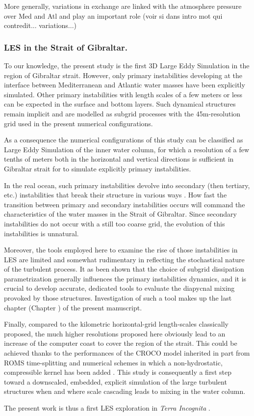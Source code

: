 \color{red}More generally, variations in exchange are linked with the atmosphere pressure over Med and Atl and play an important role (voir si dans intro mot qui contredit... variations...)\color{black}

\subsubsection{LES in the Strait of Gibraltar.}
To our knowledge, the present study is the first 3D Large Eddy Simulation in the region of Gibraltar strait. However, only primary instabilities developing at the interface between Mediterranean and Atlantic water masses have been explicitly simulated. Other primary instabilities  with length scales of a few meters or less can be expected in the surface and bottom layers. Such dynamical structures remain implicit and are modelled as subgrid processes with the 45m-resolution grid used in the present numerical configurations.

As a consequence the numerical configurations of this study can be  classified as Large Eddy Simulation of the inner water column, for which a resolution of a few tenths of meters both in the horizontal and vertical directions is sufficient in Gibraltar strait for to simulate explicitly primary instabilities.

In the real ocean, such primary instabilities devolve into secondary (then tertiary, etc.) instabilities that break their structure in various ways \citep{mashayek_2012}. How fast the transition between primary and secondary instabilities occurs will command the characteristics of the water masses in the Strait of Gibraltar. Since secondary instabilities do not occur with a still too coarse grid, the evolution of this instabilities is unnatural.

Moreover, the tools employed here to examine the rise of those instabilities in LES are limited and somewhat rudimentary in reflecting the stochastical nature of the turbulent process. It as been shown that the choice of subgrid dissipation parametrization generally influences the primary instabilities dynamics, and it is crucial to develop accurate, dedicated tools to evaluate the diapycnal mixing provoked by those structures. Investigation of such a tool makes up the last chapter (Chapter ) of the present manuscript.

Finally, compared to the kilometric horizontal-grid length-scales classically proposed, the much higher resolutions proposed here obviously lead to an increase of the computer coast to cover the region of the strait. This could be achieved thanks to the performances of the CROCO model inherited in part from ROMS time-splitting and numerical schemes \citep{shchepetkin_regional_2005} in which a non-hydrostatic, compressible kernel has been added \citep{Auclair2018, hilt_2020}. This study is consequently a first step toward a downscaled, embedded, explicit simulation of the large turbulent structures when and where scale cascading leads to mixing in the water column.

The present work is thus a first LES exploration in \textit{Terra Incognita} \citep{scotti_large_2010, wyngaard_toward_2004}.